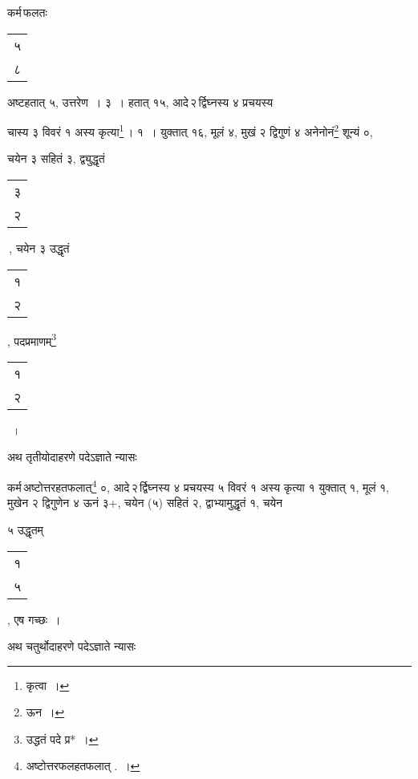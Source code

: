 \documentclass[10pt, openany]{book}
\begin{document}
{{{{{{
\vspace{3mm}

{कर्म\textendash \,फलतः \begin{tabular}{|c|}५\\ ८\end{tabular} अष्टहतात् ५, उत्तरेण~। ३~। हतात् १५,
आदे\textendash \,२\textendash \,र्द्विघ्नस्य ४ प्रचयस्य}
{चास्य ३ विवरं १ अस्य कृत्या\renewcommand{\thefootnote}{१}\footnote{कृत्वा~।}\,। १~। युक्तात् १६, मूलं ४, मुखं २
द्विगुणं ४ अनेनोनं\renewcommand{\thefootnote}{२}\footnote{ऊन~।} शून्यं ०,}
{चयेन ३ सहितं ३, द्व्युद्धृतं \begin{tabular}{|c|} ३ \\२ \end{tabular}\,, चयेन ३ उद्धृतं\begin{tabular}{c}१\\ २\end{tabular},
पदप्रमाणम्\renewcommand{\thefootnote}{३}\footnote{उद्धतं पदे प्र*~।} \begin{tabular}{|c|} १\\ २\end{tabular}~।}
\vspace{3mm}

{अथ तृतीयोदाहरणे पदेऽज्ञाते न्यासः\textemdash}
\vspace{2mm}

\vspace{3mm}

{कर्म\textendash \,अष्टोत्तरहतफलात्\renewcommand{\thefootnote}{६}\footnote{अष्टोत्तरफलहतफलात् .~।} ०, आदे\textendash \,२\textendash \,र्द्विघ्नस्य ४ प्रचयस्य ५
विवरं १ अस्य कृत्या १}
{युक्तात् १, मूलं १, मुखेन २ द्विगुणेन ४ ऊनं ३$+$, चयेन (५) सहितं २,
द्वाभ्यामुद्धृतं १, चयेन}
{५ उद्धृतम् \begin{tabular}{|c|}१ \\५\end{tabular} , एष गच्छः~।}
\vspace{3mm}

{अथ चतुर्थोदाहरणे पदेऽज्ञाते न्यासः\textendash}
\vspace{2mm}

}}}}}}
\end{document}
